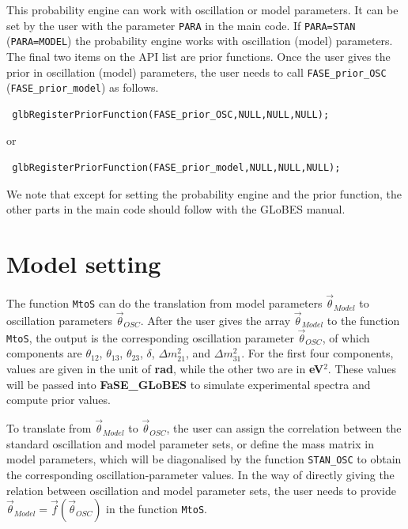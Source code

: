 \documentclass[aps,prd,nofootinbib,preprint]{revtex4}
\begin{document}
This probability engine can work with oscillation or model parameters. It can be set by the user with the parameter \texttt{PARA} in the main code. If \texttt{PARA=STAN} (\texttt{PARA=MODEL}) the probability engine works with oscillation (model) parameters. The final two items on the API list are prior functions. Once the user gives the prior in oscillation (model) parameters, the user needs to call \texttt{FASE\_prior\_OSC} (\texttt{FASE\_prior\_model}) as follows.
\begin{verbatim}
 glbRegisterPriorFunction(FASE_prior_OSC,NULL,NULL,NULL);
\end{verbatim}
or
\begin{verbatim}
 glbRegisterPriorFunction(FASE_prior_model,NULL,NULL,NULL);
\end{verbatim}

We note that except for setting the probability engine and the prior function, the other parts in the main code should follow with the GLoBES manual. 


\section{Model setting}\label{sec:model_set}

The function \texttt{MtoS} can do the translation from model parameters $\vec{\theta}_{Model}$ to oscillation parameters $\vec{\theta}_{OSC}$. After the user gives the array $\vec{\theta}_{Model}$ to the function \texttt{MtoS}, the output is the corresponding oscillation parameter $\vec{\theta}_{OSC}$, of which components are $\theta_{12}$, $\theta_{13}$, $\theta_{23}$, $\delta$, $\Delta m_{21}^2$, and $\Delta m_{31}^2$. For the first four components, values are given in the unit of \textbf{rad}, while the other two are in \textbf{eV$^2$}. These values will be passed into \textbf{FaSE\_GLoBES} to simulate experimental spectra and compute prior values.

To translate from $\vec{\theta}_{Model}$ to $\vec{\theta}_{OSC}$, the user can assign the correlation between the standard oscillation and model parameter sets, or define the mass matrix in model parameters, which will be diagonalised by the function \texttt{STAN\_OSC} to obtain the corresponding oscillation-parameter values. 
In the way of directly giving the relation between oscillation and model parameter sets, the user needs to provide
$\vec{\theta}_{Model}=\vec{f}(\vec{\theta}_{OSC})$ in the function \texttt{MtoS}.
%
\end{document}
